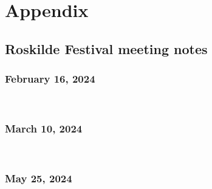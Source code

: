 \chapter{Appendix}

\section{Roskilde Festival meeting notes}
\label{appendix:rf-meeting-notes}

\subsection{February 16, 2024}
\


\subsection{March 10, 2024}
\


\subsection{May 25, 2024}
\

